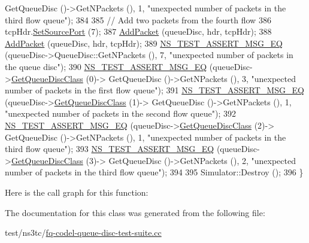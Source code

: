 \begin{DoxyCode}
      GetQueueDisc ()->GetNPackets (), 1, \textcolor{stringliteral}{"unexpected number of packets in the third flow queue"});
384 
385   \textcolor{comment}{// Add two packets from the fourth flow}
386   tcpHdr.\hyperlink{classns3_1_1TcpHeader_aceb2630b3d43118ee576aec58f55a0ff}{SetSourcePort} (7);
387   \hyperlink{classFqCoDelQueueDiscTCPFlowsSeparation_ae3d3e59d786d4cc53a9140ac1a870a4b}{AddPacket} (queueDisc, hdr, tcpHdr);
388   \hyperlink{classFqCoDelQueueDiscTCPFlowsSeparation_ae3d3e59d786d4cc53a9140ac1a870a4b}{AddPacket} (queueDisc, hdr, tcpHdr);
389   \hyperlink{group__testing_ga2a9d78cffb3db8e867c35fff0b698cf5}{NS\_TEST\_ASSERT\_MSG\_EQ} (queueDisc->QueueDisc::GetNPackets (), 7, \textcolor{stringliteral}{"unexpected number
       of packets in the queue disc"});
390   \hyperlink{group__testing_ga2a9d78cffb3db8e867c35fff0b698cf5}{NS\_TEST\_ASSERT\_MSG\_EQ} (queueDisc->\hyperlink{classns3_1_1QueueDisc_a584d228f7bff3f754d32793a38134556}{GetQueueDiscClass} (0)->
      GetQueueDisc ()->GetNPackets (), 3, \textcolor{stringliteral}{"unexpected number of packets in the first flow queue"});
391   \hyperlink{group__testing_ga2a9d78cffb3db8e867c35fff0b698cf5}{NS\_TEST\_ASSERT\_MSG\_EQ} (queueDisc->\hyperlink{classns3_1_1QueueDisc_a584d228f7bff3f754d32793a38134556}{GetQueueDiscClass} (1)->
      GetQueueDisc ()->GetNPackets (), 1, \textcolor{stringliteral}{"unexpected number of packets in the second flow queue"});
392   \hyperlink{group__testing_ga2a9d78cffb3db8e867c35fff0b698cf5}{NS\_TEST\_ASSERT\_MSG\_EQ} (queueDisc->\hyperlink{classns3_1_1QueueDisc_a584d228f7bff3f754d32793a38134556}{GetQueueDiscClass} (2)->
      GetQueueDisc ()->GetNPackets (), 1, \textcolor{stringliteral}{"unexpected number of packets in the third flow queue"});
393   \hyperlink{group__testing_ga2a9d78cffb3db8e867c35fff0b698cf5}{NS\_TEST\_ASSERT\_MSG\_EQ} (queueDisc->\hyperlink{classns3_1_1QueueDisc_a584d228f7bff3f754d32793a38134556}{GetQueueDiscClass} (3)->
      GetQueueDisc ()->GetNPackets (), 2, \textcolor{stringliteral}{"unexpected number of packets in the third flow queue"});
394 
395   Simulator::Destroy ();
396 \}
\end{DoxyCode}


Here is the call graph for this function\+:




The documentation for this class was generated from the following file\+:\begin{DoxyCompactItemize}
\item 
test/ns3tc/\hyperlink{fq-codel-queue-disc-test-suite_8cc}{fq-\/codel-\/queue-\/disc-\/test-\/suite.\+cc}\end{DoxyCompactItemize}

